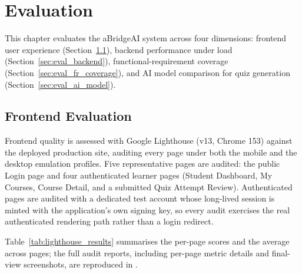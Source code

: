 \section{Evaluation}
\label{sec:evaluation}

This chapter evaluates the aBridgeAI system across four dimensions: frontend user experience (Section~\ref{sec:eval_frontend}), backend performance under load (Section~\ref{sec:eval_backend}), functional-requirement coverage (Section~\ref{sec:eval_fr_coverage}), and AI model comparison for quiz generation (Section~\ref{sec:eval_ai_model}).

\subsection{Frontend Evaluation}
\label{sec:eval_frontend}

Frontend quality is assessed with Google Lighthouse (v13, Chrome 153) against the deployed production site, auditing every page under both the mobile and the desktop emulation profiles. Five representative pages are audited: the public Login page and four authenticated learner pages (Student Dashboard, My Courses, Course Detail, and a submitted Quiz Attempt Review). Authenticated pages are audited with a dedicated test account whose long-lived session is minted with the application's own signing key, so every audit exercises the real authenticated rendering path rather than a login redirect.

Table~\ref{tab:lighthouse_results} summarises the per-page scores and the average across pages; the full audit reports, including per-page metric details and final-view screenshots, are reproduced in .

